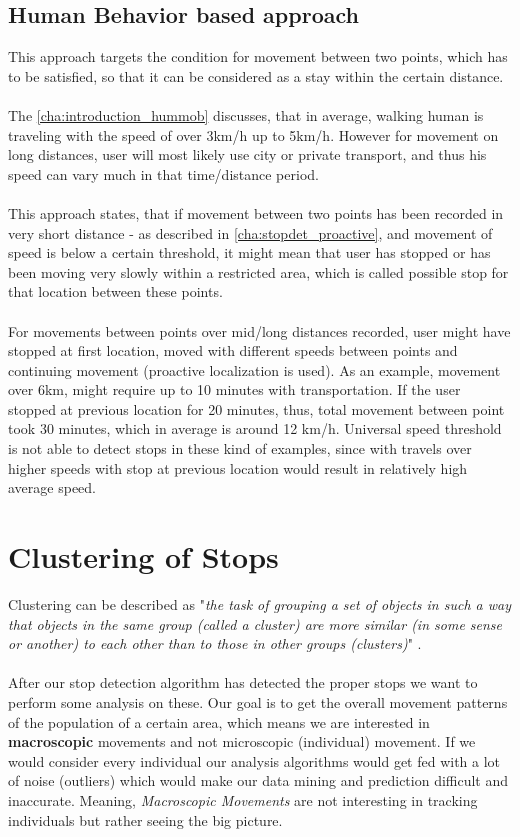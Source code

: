 \subsection{Human Behavior based approach}
\label{cha:stopdet_bh}

This approach targets the condition for movement between two points, which has to be satisfied, so that it can be considered as a stay within the certain distance. 
\\\\
The \autoref{cha:introduction_hummob} discusses, that in average, walking human is traveling with the speed of over 3km/h up to 5km/h. However for movement on long distances, user will most likely use city or private transport, and thus his speed can vary much in that time/distance period.
\\\\
This approach states, that if movement between two points has been recorded in very short distance - as described in \autoref{cha:stopdet_proactive}, and movement of speed is below a certain threshold, it might mean that user has stopped or has been moving very slowly within a restricted area, which is called possible stop for that location between these points. 
\\\\
For movements between points over mid/long distances recorded, user might have stopped at first location, moved with different speeds between points and continuing movement (proactive localization is used). As an example, movement over 6km, might require up to 10 minutes with transportation. If the user stopped at previous location for 20 minutes, thus, total movement between point took 30 minutes, which in average is around 12 km/h. Universal speed threshold is not able to detect stops in these kind of examples, since with travels over higher speeds with stop at previous location would result in relatively high average speed. 

\section{Clustering of Stops}

Clustering can be described as "\textit{the task of grouping a set of objects in such a way that objects in the same group (called a cluster) are more similar (in some sense or another) to each other than to those in other groups (clusters)}" \cite{clustering}. 
\\\\
After our stop detection algorithm has detected the proper stops we want to perform some analysis on these. Our goal is to get the overall movement patterns of the population of a certain area, which means we are interested in \textbf{macroscopic} movements and not microscopic (individual) movement. If we would consider every individual our analysis algorithms would get fed with a lot of noise (outliers) which would make our data mining and prediction difficult and inaccurate. Meaning, \textit{Macroscopic Movements} are not interesting in tracking individuals but rather seeing the big picture.

